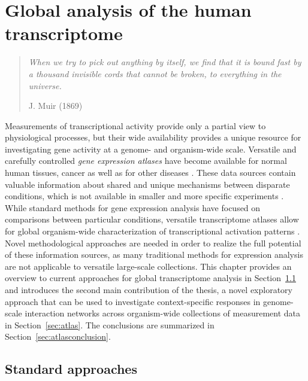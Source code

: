 \chapter{Global analysis of the human transcriptome}\label{ch:atlases}

\begin{quotation}
\emph{When we try to pick out anything by itself, we find that it is bound fast by a thousand invisible cords that cannot be broken, to everything in the universe.}
\begin{flushright}
J. Muir (1869)
\end{flushright}
\end{quotation}


Measurements of transcriptional activity provide only a partial view
to physiological processes, but their wide availability provides a
unique resource for investigating gene activity at a genome- and
organism-wide scale. Versatile and carefully controlled {\it gene
expression atlases} have become available for normal human tissues,
cancer as well as for other diseases \citep[see, for
instance,][]{Kilpinen08, Lukk10, Roth06, Su04}. These data sources
contain valuable information about shared and unique mechanisms
between disparate conditions, which is not available in smaller and
more specific experiments \citep{Lage08, Scherf2000}.  While standard
methods for gene expression analysis have focused on comparisons
between particular conditions, versatile transcriptome atlases allow
for global organism-wide characterization of transcriptional
activation patterns \citep{Levine06}. Novel methodological approaches
are needed in order to realize the full potential of these information
sources, as many traditional methods for expression analysis are not
applicable to versatile large-scale collections. This chapter provides
an overview to current approaches for global transcriptome analysis in
Section~\ref{sec:standard} and introduces the second main contribution
of the thesis, a novel exploratory approach that can be used to
investigate context-specific responses in genome-scale interaction
networks across organism-wide collections of measurement data in
Section~\ref{sec:atlas}. The conclusions are summarized in
Section~\ref{sec:atlasconclusion}. 



\section{Standard approaches}\label{sec:standard}

